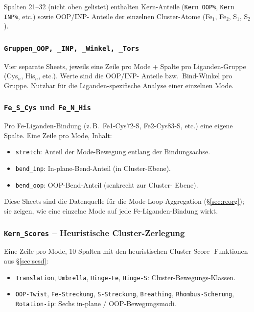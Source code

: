 \documentclass[11pt,a4paper,twoside]{article}
\theoremstyle{remark}
\begin{document}
Spalten 21--32 (nicht oben gelistet) enthalten Kern-Anteile
(\texttt{Kern OOP\%}, \texttt{Kern INP\%}, etc.) sowie OOP/INP-
Anteile der einzelnen Cluster-Atome (Fe$_1$, Fe$_2$, S$_1$, S$_2$).

\subsubsection*{\texttt{Gruppen\_OOP, \_INP, \_Winkel, \_Tors}}

Vier separate Sheets, jeweils eine Zeile pro Mode + Spalte pro
Liganden-Gruppe (Cys$_n$, His$_n$, etc.). Werte sind die OOP/INP-
Anteile bzw.\ Bind-Winkel pro Gruppe. Nutzbar f\"ur die
Liganden-spezifische Analyse einer einzelnen Mode.

\subsubsection*{\texttt{Fe\_S\_Cys} und \texttt{Fe\_N\_His}}

Pro Fe-Liganden-Bindung (z.\,B.\ Fe1-Cys72-S, Fe2-Cys83-S, etc.)
eine eigene Spalte. Eine Zeile pro Mode, Inhalt:
\begin{itemize}\setlength{\itemsep}{0pt}
  \item \texttt{stretch}: Anteil der Mode-Bewegung entlang der
        Bindungsachse.
  \item \texttt{bend\_inp}: In-plane-Bend-Anteil (in Cluster-Ebene).
  \item \texttt{bend\_oop}: OOP-Bend-Anteil (senkrecht zur Cluster-
        Ebene).
\end{itemize}

Diese Sheets sind die Datenquelle f\"ur die Mode-Loop-Aggregation
(\S\ref{sec:reorg}); sie zeigen, wie eine einzelne Mode auf jede
Fe-Liganden-Bindung wirkt.

\subsubsection*{\texttt{Kern\_Scores} -- Heuristische Cluster-Zerlegung}

Eine Zeile pro Mode, 10 Spalten mit den heuristischen Cluster-Score-
Funktionen aus \S\ref{sec:scsd}:

\begin{itemize}\setlength{\itemsep}{0pt}
  \item \texttt{Translation}, \texttt{Umbrella}, \texttt{Hinge-Fe},
        \texttt{Hinge-S}: Cluster-Bewegungs-Klassen.
  \item \texttt{OOP-Twist}, \texttt{Fe-Streckung},
        \texttt{S-Streckung}, \texttt{Breathing},
        \texttt{Rhombus-Scherung}, \texttt{Rotation-ip}:
        Sechs in-plane / OOP-Bewegungsmodi.
\end{itemize}
\end{document}
